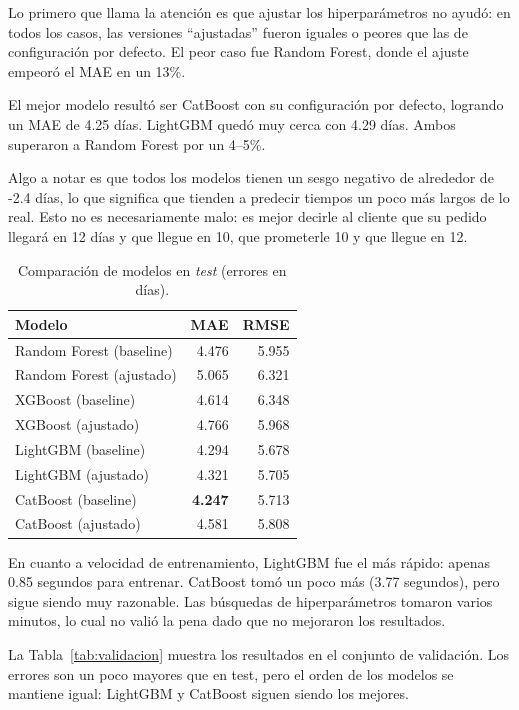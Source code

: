 \documentclass[journal]{IEEEtran}
\begin{document}
Lo primero que llama la atención es que ajustar los hiperparámetros no ayudó: en todos los casos, las versiones ``ajustadas'' fueron iguales o peores que las de configuración por defecto. El peor caso fue Random Forest, donde el ajuste empeoró el MAE en un 13\%.

El mejor modelo resultó ser CatBoost con su configuración por defecto, logrando un MAE de 4.25 días. LightGBM quedó muy cerca con 4.29 días. Ambos superaron a Random Forest por un 4--5\%.

Algo a notar es que todos los modelos tienen un sesgo negativo de alrededor de -2.4 días, lo que significa que tienden a predecir tiempos un poco más largos de lo real. Esto no es necesariamente malo: es mejor decirle al cliente que su pedido llegará en 12 días y que llegue en 10, que prometerle 10 y que llegue en 12.

\begin{table}[H]
	\centering
	\caption{Comparación de modelos en \textit{test} (errores en días).}
	\label{tab:modelos}
	\begin{tabular}{lrr}
		\hline
		Modelo                   & MAE            & RMSE  \\
		\hline
		Random Forest (baseline) & 4.476          & 5.955 \\
		Random Forest (ajustado) & 5.065          & 6.321 \\
		XGBoost (baseline)       & 4.614          & 6.348 \\
		XGBoost (ajustado)       & 4.766          & 5.968 \\
		LightGBM (baseline)      & 4.294          & 5.678 \\
		LightGBM (ajustado)      & 4.321          & 5.705 \\
		CatBoost (baseline)      & \textbf{4.247} & 5.713 \\
		CatBoost (ajustado)      & 4.581          & 5.808 \\
		\hline
	\end{tabular}
\end{table}

En cuanto a velocidad de entrenamiento, LightGBM fue el más rápido: apenas 0.85 segundos para entrenar. CatBoost tomó un poco más (3.77 segundos), pero sigue siendo muy razonable. Las búsquedas de hiperparámetros tomaron varios minutos, lo cual no valió la pena dado que no mejoraron los resultados.

La Tabla~\ref{tab:validacion} muestra los resultados en el conjunto de validación. Los errores son un poco mayores que en test, pero el orden de los modelos se mantiene igual: LightGBM y CatBoost siguen siendo los mejores.
\end{document}
